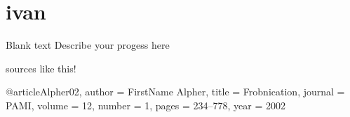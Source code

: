 \section{ivan}
\label{sec:ivan}


Blank text
Describe your progess here


sources like this!

@article{Alpher02,
author = {FirstName Alpher},
title = {Frobnication},
journal = PAMI,
volume = 12,
number = 1,
pages = {234--778},
year = 2002
}



